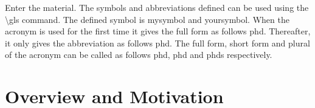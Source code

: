 {Enter the material. The symbols and abbreviations defined can be used using the \textbackslash gls command. The defined symbol is \gls{mysymbol} and \gls{yoursymbol}. When the acronym is used for the first time it gives the full form as follows \gls{phd}. Thereafter, it only gives the abbreviation as follows \gls{phd}. The full form, short form and plural of the acronym can be called as follows \acrfull{phd}, \acrshort{phd} and \glspl{phd} respectively.



\section{Overview and Motivation}
\label{sec1.1}

\begin{comment}
{Typically the first chapter is the Introduction. The main goal of your introduction is to identify a problem that is worthy of investigation. It must also provide some idea of your research goals and approach to research.  Specific objectives can be introduced in the introduction chapter or they can be saved for later after you've provided additional background on the topic and state of the current research and its gaps.  The Introductory chapter often concludes with a summary of the organization of the thesis, including identification of the general content of specific chapters and appendices.}
\end{comment}



}
